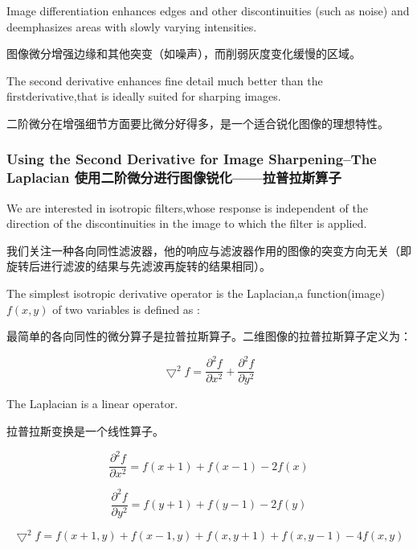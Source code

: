 \documentclass[12pt]{article}
\numberwithin{equation}{section}%
\begin{document}
Image differentiation enhances edges and other discontinuities (such as noise) and deemphasizes areas with slowly varying intensities.

图像微分增强边缘和其他突变（如噪声），而削弱灰度变化缓慢的区域。

The second derivative enhances fine detail much better than the firstderivative,that is ideally suited for sharping images.

二阶微分在增强细节方面要比微分好得多，是一个适合锐化图像的理想特性。

\subsubsection{Using the Second Derivative for Image Sharpening--The Laplacian 使用二阶微分进行图像锐化——拉普拉斯算子}

We are interested in isotropic filters,whose response is independent of the direction of the discontinuities in the image to which the filter is applied.

我们关注一种各向同性滤波器，他的响应与滤波器作用的图像的突变方向无关（即旋转后进行滤波的结果与先滤波再旋转的结果相同）。

The  simplest isotropic derivative operator is the Laplacian,a function(image) $f(x,y)$ of two variables is defined as :

最简单的各向同性的微分算子是拉普拉斯算子。二维图像的拉普拉斯算子定义为：

\begin{equation} \label{3.29}
\bigtriangledown^{2}f= \frac{\partial^{2}f}{\partial x^{2}}+\frac{\partial^{2}f}{\partial y^{2}}
\end{equation}

The Laplacian is a linear operator.

拉普拉斯变换是一个线性算子。


\begin{equation} \label{3.30}
 \frac{\partial^{2}f}{\partial x^{2}}=f(x+1)+f(x-1)-2f(x)
\end{equation}

\begin{equation} \label{3.31}
 \frac{\partial^{2}f}{\partial y^{2}}=f(y+1)+f(y-1)-2f(y)
\end{equation}

\begin{equation} \label{3.32}
\bigtriangledown^{2}f= f(x+1,y)+f(x-1,y)+f(x,y+1)+f(x,y-1)-4f(x,y)
\end{equation}
\end{document}
